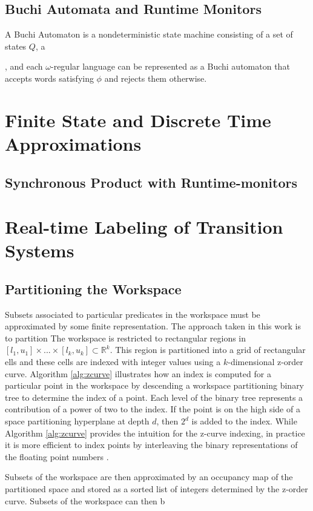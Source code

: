\documentclass{llncs}
\begin{document}
\subsection{Buchi Automata and Runtime Monitors}
A Buchi Automaton is a nondeterministic state machine consisting of a set of states $Q$, a 

, and each $\omega$-regular language can be represented as a Buchi automaton that accepts words satisfying $\phi$ and rejects them otherwise.
%


\section{\label{sec:approach}Finite State and Discrete Time Approximations}

\subsection{Synchronous Product with Runtime-monitors}
\section{\label{sec:Approach}Real-time Labeling of Transition Systems}
\subsection{Partitioning the Workspace}
Subsets associated to particular predicates in the workspace must be approximated by some finite representation. 
%
The approach taken in this work is to partition  
The workspace is restricted to rectangular regions in $[l_1,u_1]\times ... \times [l_k,u_k]\subset \mathbb{R}^k$.
%
This region is partitioned into a grid of rectangular ells and these cells are indexed with integer values using a $k$-dimensional z-order curve.
%
Algorithm \ref{alg:zcurve} illustrates how an index is computed for a particular point in the workspace by descending a workspace partitioning binary tree to determine the index of a point. 
%
Each level of the binary tree represents a contribution of a power of two to the index. 
%
If the point is on the high side of a space partitioning hyperplane at depth $d$, then $2^d$ is added to the index.  
%
While Algorithm \ref{alg:zcurve} provides the intuition for the z-curve indexing, in practice it is more efficient to index points by interleaving the binary representations of the floating point numbers . 

Subsets of the workspace are then approximated by an occupancy map of the partitioned space and stored as a sorted list of integers determined by the z-order curve.
%
Subsets of the workspace can then b
\end{document}
